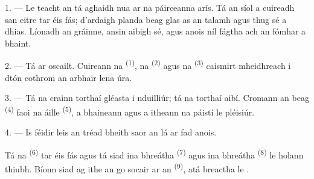%
%


\VUsaut{5.0mm}
\VUsaut{3.0mm}
\VUsaut{3.0mm}
\VUsaut{4.0mm}
\VUsaut{3.0mm}

1. --- Le teacht an  tá aghaidh nua ar na páirceanna arís. Tá an
síol a cuireadh san eitre tar éis fás; d'ardaigh planda beag glas as an talamh agus
thug sé a dhias. Líonadh an gráinne, ansin aibigh sé, agus anois níl fágtha ach an
fómhar a bhaint.

2. --- Tá  ar oscailt. Cuireann na
 \textsuperscript{(1)}, na 
\textsuperscript{(2)} agus na  \textsuperscript{(3)} caismirt
mheidhreach i dtón cothrom an arbhair lena  úra.

3. --- Tá na crainn torthaí gléasta i nduilliúr; tá na torthaí aibí. Cromann an
 beag \textsuperscript{(4)} faoi na  áille
\textsuperscript{(5)}, a bhaineann agus a itheann na páistí le pléisiúr.

4. --- Is féidir leis an tréad bheith saor an lá ar fad anois.

Tá na  \textsuperscript{(6)} tar éis fás agus tá siad ina
 bhreátha \textsuperscript{(7)} agus ina 
bhreátha \textsuperscript{(8)} le holann thiubh. Bíonn siad ag ithe an
 go socair ar an  \textsuperscript{(9)}, atá
breactha le .

